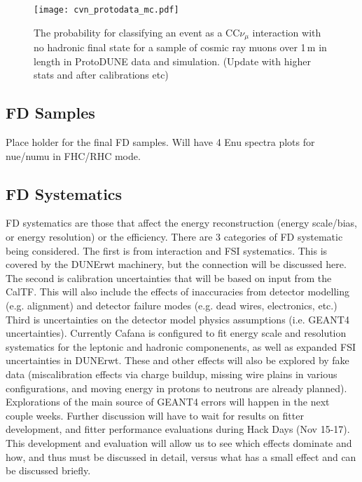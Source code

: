 \begin{figure}
    \centering
    \texttt{[image: cvn\_protodata\_mc.pdf]}
    \caption{The probability for classifying an event as a CC$\nu_\mu$ interaction with no hadronic final state for a sample of cosmic ray muons over 1\,m in length in ProtoDUNE data and simulation. (Update with higher stats and after calibrations etc)}
    \label{fig:protodunecvn}
\end{figure}

\subsection{FD Samples}

Place holder for the final FD samples. Will have 4 Enu spectra plots for nue/numu in FHC/RHC mode.

\subsection{FD Systematics}
FD systematics are those that affect the energy reconstruction (energy scale/bias, or energy resolution) or the efficiency. There are 3 categories of FD systematic being considered. The first is from interaction and FSI systematics. This is covered by the DUNErwt machinery, but the connection will be discussed here. The second is calibration uncertainties that will be based on input from the CalTF. This will also include the effects of inaccuracies from detector modelling (e.g. alignment) and detector failure modes (e.g. dead wires, electronics, etc.) Third is uncertainties on the detector model physics assumptions (i.e. GEANT4 uncertainties).  Currently Cafana is configured to fit energy scale and resolution systematics for the leptonic and hadronic componenents, as well as expanded FSI uncertainties in DUNErwt. These and other effects will also be explored by fake data (miscalibration effects via charge buildup, missing wire plains in various configurations, and moving energy in protons to neutrons are already planned). Explorations of the main source of GEANT4 errors will happen in the next couple weeks. Further discussion will have to wait for results on fitter development, and fitter performance evaluations during
Hack Days (Nov 15-17). This development and evaluation will allow us to see which effects dominate and how, and thus must be discussed in detail, versus what has a small effect and can be discussed briefly.



